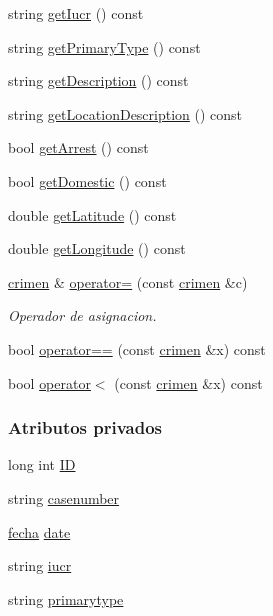 \begin{DoxyCompactItemize}
string \hyperlink{classcrimen_a6d2bac20ef41f8c9944ca7deb8cc2ed5}{get\+Iucr} () const 
\item 
string \hyperlink{classcrimen_ae47e93acec39b388cde221a679bccf9c}{get\+Primary\+Type} () const 
\item 
string \hyperlink{classcrimen_a61789d65209d167149df197272d8feba}{get\+Description} () const 
\item 
string \hyperlink{classcrimen_a9de655b3eea3592f6e5d017e83fd6060}{get\+Location\+Description} () const 
\item 
bool \hyperlink{classcrimen_a6cab67bfdad566ce444236fc7c8df312}{get\+Arrest} () const 
\item 
bool \hyperlink{classcrimen_a1849e7a82111773a6919318b9cf1d05d}{get\+Domestic} () const 
\item 
double \hyperlink{classcrimen_adfd62cd48c7d1d0259c007d3f6c39d58}{get\+Latitude} () const 
\item 
double \hyperlink{classcrimen_a0c24726cd34dc975b3fc7c664287a15c}{get\+Longitude} () const 
\item 
\hyperlink{classcrimen}{crimen} \& \hyperlink{classcrimen_a675f3a6e34bf43e20613a96b93cbb407}{operator=} (const \hyperlink{classcrimen}{crimen} \&c)
\begin{DoxyCompactList}\small\item\em Operador de asignacion. \end{DoxyCompactList}\item 
bool \hyperlink{classcrimen_aeced9ce4b7486123412975b8884d1ab7}{operator==} (const \hyperlink{classcrimen}{crimen} \&x) const 
\item 
bool \hyperlink{classcrimen_ac865fdb9712f2426d947b1b5546b50e5}{operator$<$} (const \hyperlink{classcrimen}{crimen} \&x) const 
\end{DoxyCompactItemize}
\subsubsection*{Atributos privados}
\begin{DoxyCompactItemize}
\item 
long int \hyperlink{classcrimen_a59702f88f0b0c25781ae3d296790dcb8}{I\+D}
\item 
string \hyperlink{classcrimen_ad388e966532011945fcdb69cb29b74ff}{casenumber}
\item 
\hyperlink{classfecha}{fecha} \hyperlink{classcrimen_ab3ef462c5da98dbf03142c06e8c1a099}{date}
\item 
string \hyperlink{classcrimen_a5699c8bd36d3cad23cff70cbd984f616}{iucr}
\item 
string \hyperlink{classcrimen_a6d23454b3b810d0d9ff3245ab6bfbfbe}{primarytype}
\end{DoxyCompactItemize}
